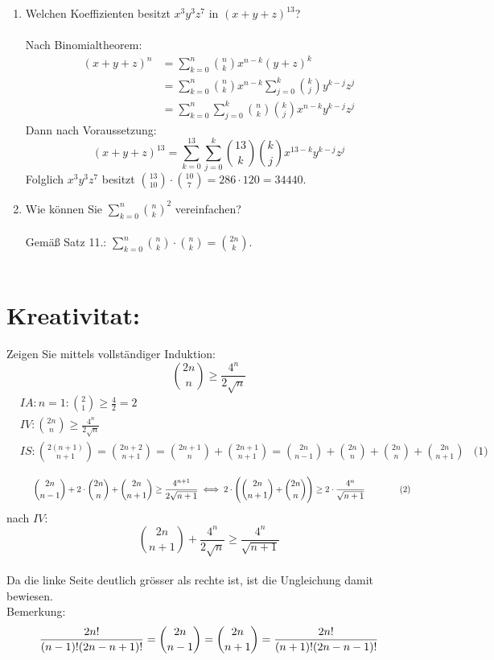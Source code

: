 \begin{enumerate}[label=(\alph*)]
        \item Welchen Koeffizienten besitzt $x^3y^3z^7$ in $(x+y+z)^{13}$?\\\\
        Nach Binomialtheorem:
        \begin{align*}
        (x+y+z)^{n} &= \sum_{k=0}^{n} \binom{n}{k}x^{n-k}(y+z)^k \\
        &= \sum_{k=0}^{n} \binom{n}{k}x^{n-k}\sum_{j=0}^{k}\binom{k}{j}y^{k-j}z^j \\
        &= \sum_{k=0}^{n}\sum_{j=0}^{k} \binom{n}{k}\binom{k}{j}x^{n-k}y^{k-j}z^j
        \end{align*}
        Dann nach Voraussetzung: 
        \[(x+y+z)^{13} = \sum_{k=0}^{13}\sum_{j=0}^{k} \binom{13}{k}\binom{k}{j}x^{13-k}y^{k-j}z^j\]
        Folglich $x^3y^3z^7$ besitzt $\binom{13}{10}\cdot\binom{10}{7} = 286 \cdot 120 = 34440$.

        \item Wie können Sie $\sum_{k=0}^n \binom{n}{k}^2$ vereinfachen?\\\\
        Gemäß Satz 11.: $\sum_{k=0}^n \binom{n}{k}\cdot\binom{n}{k} = \binom{2n}{k}$.\\\\
    \end{enumerate}
    
    \section*{Kreativitat:} 
    Zeigen Sie mittels vollständiger Induktion:
    \[\binom{2n}{n}\geq \frac{4^n}{2\sqrt n}\]
    \begin{align*}
        &IA: n=1: \binom{2}{1}\geq \frac{4}{2} = 2\\ %
        &IV: \binom{2n}{n}\geq \frac{4^n}{2\sqrt n}\\
        &IS: \binom{2(n+1)}{n+1}=\binom{2n+2}{n+1}
        = \binom{2n+1}{n} + \binom{2n+1}{n+1}
        = \binom{2n}{n-1} + \binom{2n}{n} + \binom{2n}{n} + \binom{2n}{n+1} &\textrm{(1)}\\
    \end{align*}
    \[\hspace{30pt}\binom{2n}{n-1} + 2\cdot\binom{2n}{n} + \binom{2n}{n+1} \geq \frac{4^{n+1}}{2\sqrt {n+1}}\\
    \iff 2\cdot\Bigg(\binom{2n}{n+1} + \binom{2n}{n}\Bigg) \geq 2\cdot\frac{4^n}{\sqrt {n+1}} 
    \textrm{\hspace{40pt}(2)}\\\]
    nach $IV$: \[ \binom{2n}{n+1} + \frac{4^n}{2\sqrt{n}} \geq \frac{4^n}{\sqrt {n+1}} \]\\
    Da die linke Seite deutlich grösser als rechte ist, ist die Ungleichung damit bewiesen.\\
    Bemerkung:
    \[ \frac{2n!}{(n-1)!(2n-n+1)!} = \binom{2n}{n-1} = \binom{2n}{n+1} = \frac{2n!}{(n+1)!(2n-n-1)!}\\\]
